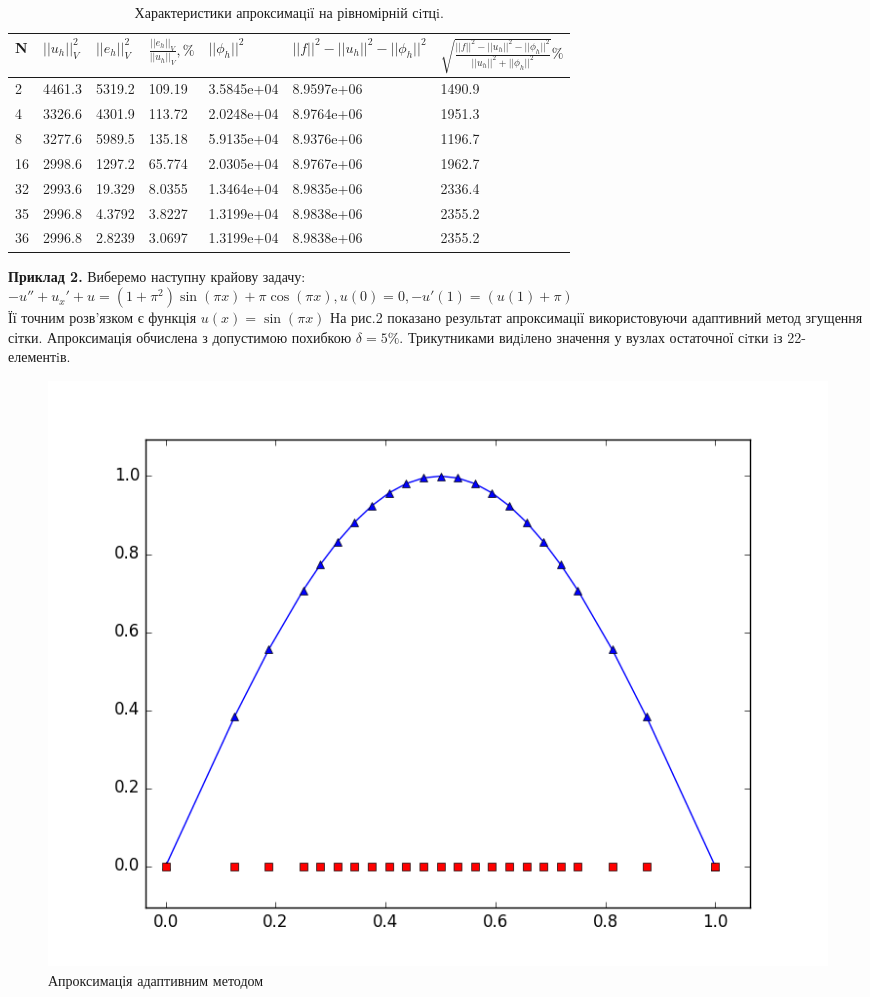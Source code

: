 \documentclass[a4paper]{article}
\numberwithin{equation}{section}
\begin{document}
\begin{table}[H]
\centering
\begin{tabular}{|l|l|l|l|l|l|l|}
\hline
N   & $ ||u_h||_V^2 $ & $ ||e_h||_V^2 $ & $ \frac{||e_h||_V}{||u_h||_V}, \% $ & $ ||\phi_h||^2 $ & $ ||f||^2 - ||u_h||^2 - ||\phi_h||^2 $ & $ \sqrt{\frac{||f||^2 - ||u_h||^2 - ||\phi_h||^2}{||u_h||^2 + ||\phi_h||^2}} \% $ \\ \hline
2 & 4461.3 & 5319.2 & 109.19  & 3.5845e+04 & 8.9597e+06 & 1490.9 \\ \hline
4 & 3326.6 & 4301.9 & 113.72  & 2.0248e+04 & 8.9764e+06 & 1951.3 \\ \hline
8 & 3277.6 & 5989.5 & 135.18  & 5.9135e+04 & 8.9376e+06 & 1196.7 \\ \hline
16 & 2998.6 & 1297.2 & 65.774 & 2.0305e+04 & 8.9767e+06 & 1962.7 \\ \hline
32 & 2993.6 & 19.329 & 8.0355 & 1.3464e+04 & 8.9835e+06 & 2336.4 \\ \hline
35 & 2996.8 & 4.3792 & 3.8227 & 1.3199e+04 & 8.9838e+06 & 2355.2 \\ \hline
36 & 2996.8 & 2.8239 & 3.0697 & 1.3199e+04 & 8.9838e+06 & 2355.2 \\ \hline

\end{tabular}
\caption{Характеристики апроксимацiї на рівномірній сiтцi.}
\end{table}

\textbf{Приклад 2.} Виберемо наступну крайову задачу:
$-u'' + u_x'+u=(1 + \pi^2)\sin(\pi x) + \pi \cos(\pi x), u(0)=0, -u'(1) = (u(1) + \pi)$\\
Її точним розв'язком є функція $ u(x) = \sin(\pi x) $
На рис.2 показано результат апроксимації використовуючи адаптивний метод згущення сітки. Апроксимація обчислена з допустимою похибкою $\delta=5\%$. Трикутниками видiлено значення у вузлах остаточної сiтки iз 22-елементiв.

\begin{figure}[H]
\includegraphics[width=\textwidth]{figure_5.png}
\caption{Апроксимація адаптивним методом}
\end{figure}
\end{document}
